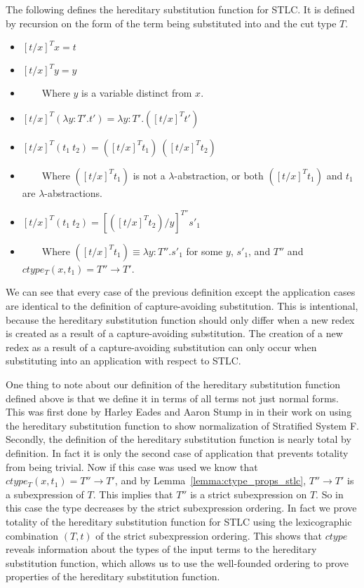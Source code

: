 \begin{definition}
  \label{def:hereditary_substitution_function_stlc}
  The following defines the hereditary substitution function for STLC.  It
  is defined by recursion on the form of the term being substituted
  into and the cut type $T$.
  \begin{itemize}
  \item[] $[t/x]^T x = t$
  \item[] $[t/x]^T y = y$
  \item[] \ \ \ \ Where $y$ is a variable distinct from $x$.
  \item[] $[t/x]^T (\lambda y:T'.t') = \lambda y:T'.([t/x]^T t')$
  \item[] $[t/x]^T (t_1\ t_2) = ([t/x]^T t_1)\ ([t/x]^T t_2)$
  \item[] \ \ \ \ Where $([t/x]^T t_1)$ is not a $\lambda$-abstraction, or both $([t/x]^T t_1)$
    and $t_1$ are $\lambda$-abstractions.
  \item[] $[t/x]^{T} (t_1\ t_2) = [([t/x]^{T} t_2)/y]^{T''} s'_1$
  \item[] \ \ \ \ Where $([t/x]^{T} t_1) \equiv \lambda y:T''.s'_1$ 
    for some $y$, $s'_1$, and $T''$ and $ctype_T(x,t_1) = T'' \to T'$.
  \end{itemize}
\end{definition}
We can see that every case of the previous definition except the
application cases are identical to the definition of capture-avoiding
substitution.  This is intentional, because the hereditary
substitution function should only differ when a new redex is created
as a result of a capture-avoiding substitution.  The creation of a new
redex as a result of a capture-avoiding substitution can only occur
when substituting into an application with respect to STLC.  

One thing to note about our definition of the hereditary substitution
function defined above is that we define it in terms of all terms not
just normal forms.  This was first done by Harley Eades and Aaron
Stump in \cite{Eades:2010} in their work on using the hereditary
substitution function to show normalization of Stratified System F.
Secondly, the definition of the hereditary substitution function is
nearly total by definition.  In fact it is only the second case of
application that prevents totality from being trivial.  Now if this
case was used we know that $ctype_T(x,t_1) = T'' \to T'$, and by
Lemma~\ref{lemma:ctype_props_stlc}, $T'' \to T'$ is a subexpression of
$T$. This implies that $T''$ is a strict subexpression on $T$.  So in
this case the type decreases by the strict subexpression ordering.  In
fact we prove totality of the hereditary substitution function for
STLC using the lexicographic combination $(T, t)$ of the strict
subexpression ordering.  This shows that $ctype$ reveals information
about the types of the input terms to the hereditary substitution
function, which allows us to use the well-founded ordering to prove
properties of the hereditary substitution function.  

